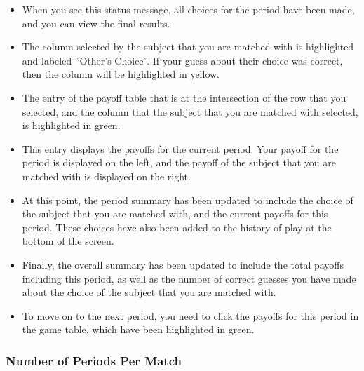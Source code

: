 \documentclass[11pt]{article}
\newcommand{\dblbkt}[1]{}
\begin{document}
\begin{itemize}
\begin{itemize}
\item When you see this status message, all choices for the period have been made, and you can view the final results.  
\item \dblbkt{1} The column selected by the subject that you are matched with is highlighted and labeled ``Other's Choice''.  If your guess about their choice was correct, then the column will be highlighted in yellow.
\item \dblbkt{1} The entry of the payoff table that is at the intersection of the row that you selected, and the column that the subject that you are matched with selected, is highlighted in green.   
\item This entry displays the payoffs for the current period.  Your payoff for the period is displayed on the left, and the payoff of the subject that you are matched with is displayed on the right.  
\item At this point, the period summary has been updated to include \dblbkt{1} the choice of the subject that you are matched with, \dblbkt{1} and the current payoffs for this period.  These choices have also been added to the \dblbkt{1} history of play at the bottom of the screen.  
\item  Finally, \dblbkt{1} the overall summary has been updated to include \dblbkt{1} the total payoffs including this period, as well as \dblbkt{1} the number of correct guesses you have made about the choice of the subject that you are matched with.
\item \dblbkt{1} To move on to the next period, you need to click the payoffs for this period in the game table, which have been highlighted in  \dblbkt{1} green. \dblbkt{slnc 3000} 
\end{itemize} 
\end{itemize}

\subsubsection*{\dblbkt{3}Number of Periods Per Match} 
\end{document}
